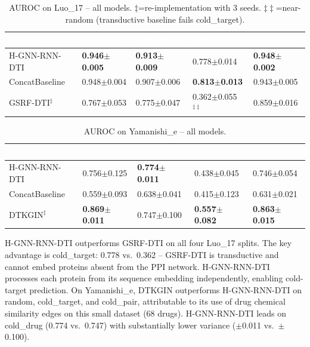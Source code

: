 \documentclass[12pt,a4paper,oneside]{report}
\newcommand{\sig}[1]{\textbf{#1}}
\begin{document}
\begin{table}[htbp]
\centering
\caption{AUROC on Luo\_17 -- all models. $\ddagger$=re-implementation with 3 seeds. $\ddag\!\ddag$=near-random (transductive baseline fails cold\_target).}
\label{tab:ext-luo}
\begin{tabular}{@{}L{3cm}C{2cm}C{2cm}C{2cm}C{2cm}@{}}
\toprule
{}
\textcolor{white}{\textbf{Model}} &
\textcolor{white}{\textbf{random}} &
\textcolor{white}{\textbf{cold\_drug}} &
\textcolor{white}{\textbf{cold\_target}} &
\textcolor{white}{\textbf{cold\_pair}} \\
\midrule
{}
H-GNN-RNN-DTI & \sig{0.946$\pm$0.005} & \sig{0.913$\pm$0.009} & 0.778$\pm$0.014 & \sig{0.948$\pm$0.002} \\
ConcatBaseline & 0.948$\pm$0.004 & 0.907$\pm$0.006 & \sig{0.813$\pm$0.013} & 0.943$\pm$0.005 \\
GSRF-DTI$^\ddagger$ & 0.767$\pm$0.053 & 0.775$\pm$0.047 & 0.362$\pm$0.055$^{\ddag\!\ddag}$ & 0.859$\pm$0.016 \\
\bottomrule
\end{tabular}
\end{table}

\begin{table}[htbp]
\centering
\caption{AUROC on Yamanishi\_e -- all models.}
\label{tab:ext-yam}
\begin{tabular}{@{}L{3cm}C{2cm}C{2cm}C{2cm}C{2cm}@{}}
\toprule
{}
\textcolor{white}{\textbf{Model}} &
\textcolor{white}{\textbf{random}} &
\textcolor{white}{\textbf{cold\_drug}} &
\textcolor{white}{\textbf{cold\_target}} &
\textcolor{white}{\textbf{cold\_pair}} \\
\midrule
{}
H-GNN-RNN-DTI & 0.756$\pm$0.125 & \sig{0.774$\pm$0.011} & 0.438$\pm$0.045 & 0.746$\pm$0.054 \\
ConcatBaseline & 0.559$\pm$0.093 & 0.638$\pm$0.041 & 0.415$\pm$0.123 & 0.631$\pm$0.021 \\
DTKGIN$^\ddagger$ & \sig{0.869$\pm$0.011} & 0.747$\pm$0.100 & \sig{0.557$\pm$0.082} & \sig{0.863$\pm$0.015} \\
\bottomrule
\end{tabular}
\end{table}

H-GNN-RNN-DTI outperforms GSRF-DTI on all four Luo\_17 splits. The key advantage is cold\_target: 0.778 vs.\ 0.362 -- GSRF-DTI is transductive and cannot embed proteins absent from the PPI network. H-GNN-RNN-DTI processes each protein from its sequence embedding independently, enabling cold-target prediction. On Yamanishi\_e, DTKGIN outperforms H-GNN-RNN-DTI on random, cold\_target, and cold\_pair, attributable to its use of drug chemical similarity edges on this small dataset (68 drugs). H-GNN-RNN-DTI leads on cold\_drug (0.774 vs.\ 0.747) with substantially lower variance ($\pm$0.011 vs.\ $\pm$0.100).
\end{document}
